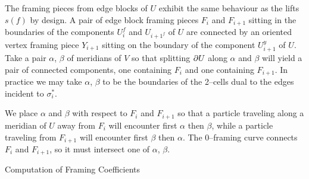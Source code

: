 The framing pieces from edge blocks of $U$ exhibit the same behaviour as the lifts $s(f)$ by design.
A pair of edge block framing pieces $F_i$ and $F_{i+1}$ sitting in the boundaries of the components $U_i^f$ and $U_{i+1^f}$ of $U$ are connected by an oriented vertex framing piece $Y_{i+1}$ sitting on the boundary of the component $U_{i+1}^y$ of $U$.
Take a pair $\alpha$, $\beta$ of meridians of $V$ so that splitting $\partial U$ along $\alpha$ and $\beta$ will yield a pair of connected components, one containing $F_i$ and one containing $F_{i+1}$.
In practice we may take $\alpha$, $\beta$ to be the boundaries of the 2--cells dual to the edges incident to $\sigma_i^*$.

We place $\alpha$ and $\beta$ with respect to $F_i$ and $F_{i+1}$ so that a particle traveling along a meridian of $U$ away from $F_i$ will encounter first $\alpha$ then $\beta$, while a particle traveling from $F_{i+1}$ will encounter first $\beta$ then $\alpha$.
The 0--framing curve connects $F_i$ and $F_{i+1}$, so it must intersect one of $\alpha$, $\beta$.

\begin{algorithm}
	\caption{Computation of Framing Coefficients}
	\label{alg:gleams}
\end{algorithm}